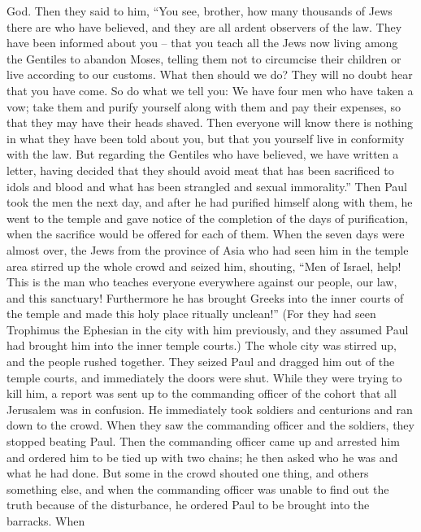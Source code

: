 {God.
Then they said
to him,
“You see,
brother,
how many
thousands
of Jews
there are
who have believed,
and
they are
all
ardent observers
of the law.
They have been informed
about
you
– that
you teach
all
the Jews
now living among the Gentiles
to abandon
Moses,
telling
them not
to circumcise
their
children
or
live
according to our customs.
What
then
should we do? They will no doubt
hear
that
you have come.
So
do
what
we tell
you: We
have four
men
who have taken a vow;
take
them
and purify
yourself along
with them
and
pay
their
expenses,
so that
they may have
their heads
shaved.
Then
everyone
will know
there is
nothing
in what
they have been told
about
you,
but
that you yourself live in conformity
with the law.
But
regarding the Gentiles
who have believed,
we
have written a letter,
having decided
that they
should avoid
meat that has been sacrificed to idols
and
blood
and
what has been strangled
and
sexual immorality.”
Then
Paul
took
the men
the next
day,
and after
he had purified
himself along
with them,
he went
to
the temple
and gave notice
of the completion
of the days
of purification,
when the sacrifice
would be offered
for
each
of them.
When
the seven
days
were almost over,
the Jews
from
the province of Asia
who had seen
him
in
the temple area
stirred up
the whole
crowd
and
seized
him,
shouting,
“Men
of Israel,
help! This
is
the man
who teaches
everyone
everywhere
against
our people,
our law,
and
this
sanctuary! Furthermore
he has brought
Greeks
into
the inner courts of the temple
and
made
this
holy
place
ritually unclean!”
(For
they had
seen
Trophimus
the Ephesian
in
the city
with
him
previously, and they assumed
Paul
had brought
him into
the inner temple courts.)
The whole
city
was stirred up,
and
the people
rushed together.
They seized
Paul
and dragged
him
out
of the temple courts,
and
immediately
the doors
were shut.
While
they were trying
to kill
him,
a report
was sent up
to the commanding officer
of the cohort
that
all
Jerusalem
was in confusion.
He
immediately
took
soldiers
and
centurions
and ran down
to
the crowd.
When
they saw
the commanding officer
and
the soldiers,
they stopped
beating
Paul.
Then
the commanding officer
came up
and arrested
him
and
ordered
him to be tied up
with two
chains;
he
then
asked
who
he was
and
what
he had done.
But
some
in
the crowd
shouted
one thing, and others
something else, and when the commanding officer
was unable
to find out
the truth because of
the disturbance,
he ordered
Paul
to be brought
into
the barracks.
When
}
